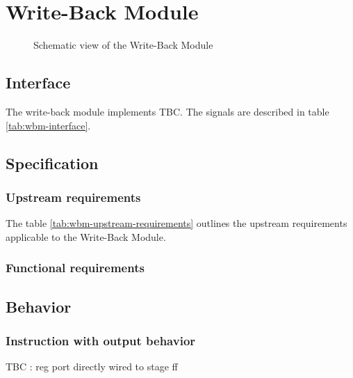 \section{Write-Back Module}

\begin{figure}[h!]
    \centering
    
    \caption{Schematic view of the Write-Back Module}
    \label{fig:wbm}
\end{figure}

\subsection{Interface}

\begin{content}
The write-back module implements TBC. The signals are described in table \ref{tab:wbm-interface}. 
\end{content}



\subsection{Specification}

\subsubsection{Upstream requirements}

The table \ref{tab:wbm-upstream-requirements} outlines the upstream requirements applicable to the Write-Back Module.



\subsubsection{Functional requirements}

\subsection{Behavior}

\subsubsection{Instruction with output behavior}

\begin{content}
  TBC : reg port directly wired to stage ff
\end{content}

